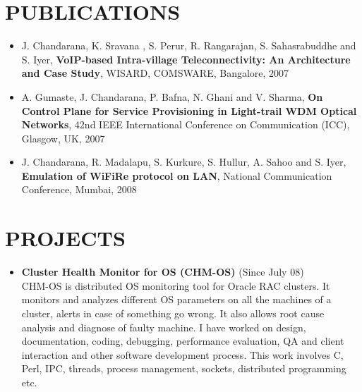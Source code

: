 \documentclass{res}
\begin{document}
\begin{resume}
					  \vspace{0.2in}

				      \section{PUBLICATIONS}
					  \begin{itemize}
					  \item  J. Chandarana, K. Sravana , S. Perur, R. Rangarajan, S. Sahasrabuddhe and S. Iyer, {\bf VoIP-based
					  Intra-village Teleconnectivity: An Architecture and Case Study}, WISARD, COMSWARE,
					  Bangalore, 2007

					  \item A. Gumaste, J. Chandarana, P. Bafna, N. Ghani and V. Sharma, {\bf On Control Plane for Service
					  Provisioning in Light-trail WDM Optical Networks}, 42nd IEEE International Conference on
					  Communication (ICC), Glasgow, UK, 2007

					  \item J. Chandarana, R. Madalapu, S. Kurkure, S. Hullur, A. Sahoo and S. Iyer, {\bf Emulation of WiFiRe
					  protocol on LAN}, National Communication Conference, Mumbai, 2008

					  \end{itemize}


					  \vspace{0.2in}

					  \section{PROJECTS}
					  \begin{itemize}
					  \item {\bf Cluster Health Monitor for OS (CHM-OS)} (Since July 08)\\
						  CHM-OS is distributed OS monitoring tool for Oracle RAC clusters. It monitors and analyzes different
						  OS parameters on all the machines of a cluster, alerts in case of something go wrong. It also allows
						  root cause analysis and diagnose of faulty machine. I have worked on design, documentation, coding,
						  debugging, performance evaluation, QA and client interaction and other software development process.
						  This work involves C, Perl, IPC, threads, process management, sockets, distributed programming etc.


\end{itemize}
\end{resume}
\end{document}
